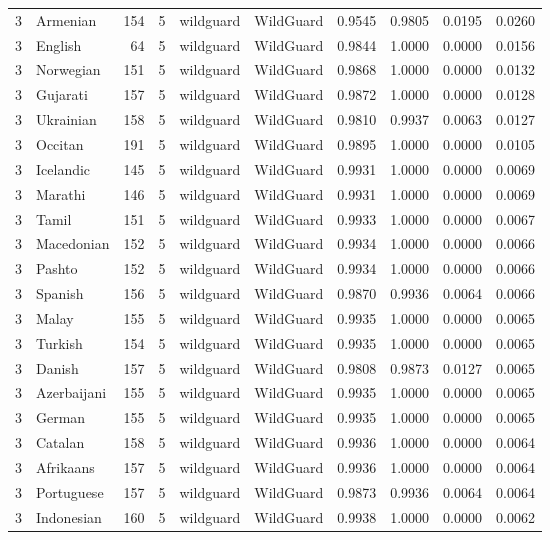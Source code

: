 \begin{tabular}{rlrrllrrrr}
3 & Armenian & 154 & 5 & wildguard & WildGuard & 0.9545 & 0.9805 & 0.0195 & 0.0260 \\
3 & English & 64 & 5 & wildguard & WildGuard & 0.9844 & 1.0000 & 0.0000 & 0.0156 \\
3 & Norwegian & 151 & 5 & wildguard & WildGuard & 0.9868 & 1.0000 & 0.0000 & 0.0132 \\
3 & Gujarati & 157 & 5 & wildguard & WildGuard & 0.9872 & 1.0000 & 0.0000 & 0.0128 \\
3 & Ukrainian & 158 & 5 & wildguard & WildGuard & 0.9810 & 0.9937 & 0.0063 & 0.0127 \\
3 & Occitan & 191 & 5 & wildguard & WildGuard & 0.9895 & 1.0000 & 0.0000 & 0.0105 \\
3 & Icelandic & 145 & 5 & wildguard & WildGuard & 0.9931 & 1.0000 & 0.0000 & 0.0069 \\
3 & Marathi & 146 & 5 & wildguard & WildGuard & 0.9931 & 1.0000 & 0.0000 & 0.0069 \\
3 & Tamil & 151 & 5 & wildguard & WildGuard & 0.9933 & 1.0000 & 0.0000 & 0.0067 \\
3 & Macedonian & 152 & 5 & wildguard & WildGuard & 0.9934 & 1.0000 & 0.0000 & 0.0066 \\
3 & Pashto & 152 & 5 & wildguard & WildGuard & 0.9934 & 1.0000 & 0.0000 & 0.0066 \\
3 & Spanish & 156 & 5 & wildguard & WildGuard & 0.9870 & 0.9936 & 0.0064 & 0.0066 \\
3 & Malay & 155 & 5 & wildguard & WildGuard & 0.9935 & 1.0000 & 0.0000 & 0.0065 \\
3 & Turkish & 154 & 5 & wildguard & WildGuard & 0.9935 & 1.0000 & 0.0000 & 0.0065 \\
3 & Danish & 157 & 5 & wildguard & WildGuard & 0.9808 & 0.9873 & 0.0127 & 0.0065 \\
3 & Azerbaijani & 155 & 5 & wildguard & WildGuard & 0.9935 & 1.0000 & 0.0000 & 0.0065 \\
3 & German & 155 & 5 & wildguard & WildGuard & 0.9935 & 1.0000 & 0.0000 & 0.0065 \\
3 & Catalan & 158 & 5 & wildguard & WildGuard & 0.9936 & 1.0000 & 0.0000 & 0.0064 \\
3 & Afrikaans & 157 & 5 & wildguard & WildGuard & 0.9936 & 1.0000 & 0.0000 & 0.0064 \\
3 & Portuguese & 157 & 5 & wildguard & WildGuard & 0.9873 & 0.9936 & 0.0064 & 0.0064 \\
3 & Indonesian & 160 & 5 & wildguard & WildGuard & 0.9938 & 1.0000 & 0.0000 & 0.0062 \\

\end{tabular}
